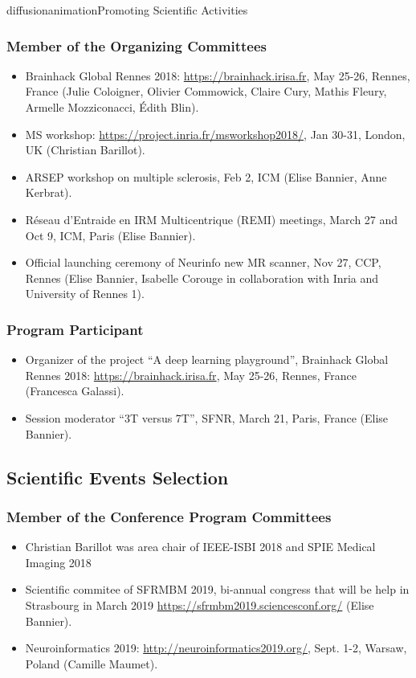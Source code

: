 \documentclass{ra2018}
\begin{document}
\begin{module}{diffusion}{animation}{Promoting Scientific Activities}
    \subsubsection{Member of the Organizing Committees}
    \begin{itemize}
        \item Brainhack Global Rennes 2018: \url{https://brainhack.irisa.fr}, May 25-26, Rennes, France (Julie Coloigner, Olivier Commowick, Claire Cury, Mathis Fleury, Armelle Mozziconacci, Édith Blin).
	    \item MS workshop: \url{https://project.inria.fr/msworkshop2018/}, Jan 30-31, London, UK (Christian Barillot).
        \item ARSEP workshop on multiple sclerosis, Feb 2, ICM (Elise Bannier, Anne Kerbrat).
        \item Réseau d'Entraide en IRM Multicentrique (REMI) meetings, March 27 and Oct 9, ICM, Paris (Elise Bannier).
        \item Official launching ceremony of Neurinfo new MR scanner, Nov 27, CCP, Rennes (Elise Bannier, Isabelle Corouge in collaboration with Inria and University of Rennes 1).

    \end{itemize}    
    \subsubsection{Program Participant}
    \begin{itemize}
        \item Organizer of the project ``A deep learning playground'', Brainhack Global Rennes 2018: \url{https://brainhack.irisa.fr}, May 25-26, Rennes, France (Francesca Galassi).
        \item Session moderator ``3T versus 7T'', SFNR, March 21, Paris, France (Elise Bannier).
    \end{itemize}  
\subsection {Scientific Events Selection}
    \subsubsection{Member of the Conference Program Committees}
    \begin{itemize}
               \item Christian Barillot was area chair of IEEE-ISBI 2018 and SPIE Medical Imaging 2018
               \item Scientific commitee of SFRMBM 2019, bi-annual congress that will be help in Strasbourg in March 2019 \url{https://sfrmbm2019.sciencesconf.org/} (Elise Bannier).
        \item Neuroinformatics 2019: \url{http://neuroinformatics2019.org/}, Sept. 1-2, Warsaw, Poland (Camille Maumet).
    \end{itemize}

\end{module}
\end{document}
